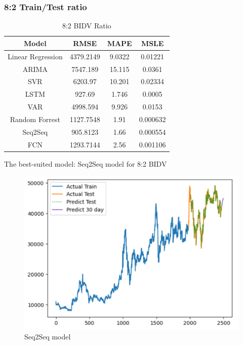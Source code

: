 \documentclass{ieeeojies}
\begin{document}
\subsubsection{8:2 Train/Test ratio}
\begin{table}[H]
    \centering
    \begin{tabular}{|c|c|c|c|}
    \hline
    Model & \textbf{RMSE} & \textbf{MAPE} & \textbf{MSLE} \\
    \hline
    Linear Regression & 4379.2149 & 9.0322 & 0.01221 \\
    \hline
    ARIMA & 7547.189 & 15.115 & 0.0361 \\
    \hline
    SVR & 6203.97 & 10.201 & 0.02334 \\
    \hline
    LSTM & 927.69 & 1.746 & 0.0005 \\
    \hline
    VAR & 4998.594 & 9.926 & 0.0153 \\
    \hline
    Random Forrest & 1127.7548 & 1.91 & 0.000632 \\
    \hline
    \rowcolor{red!10}
    Seq2Seq & 905.8123 & 1.66 & 0.000554 \\
    \hline
    FCN & 1293.7144 & 2.56 & 0.001106 \\
    \hline
    \end{tabular}
    \caption{8:2 BIDV Ratio}
    \label{tab:my_label}
\end{table}
The best-suited model:  Seq2Seq model for 8:2 BIDV
\begin{figure}[H]
    \centering
    \includegraphics[width=1\linewidth]{bidv_s2s_82.png}
    \caption{Seq2Seq model}
    \label{fig:enter-label}
\end{figure}
\end{document}
